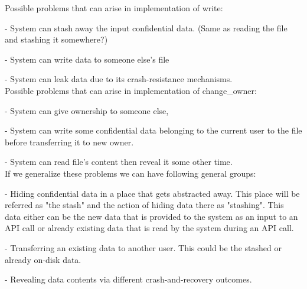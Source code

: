 \documentclass[onecolumn]{paper}
\begin{document}
Possible problems that can arise in implementation of write:

- System can stash away the input confidential data. 
(Same as reading the file and stashing it somewhere?)

- System can write data to someone else's file

- System can leak data due to its crash-resistance mechanisms.\\

Possible problems that can arise in implementation of change\_owner:

- System can give ownership to someone else,

- System can write some confidential data belonging to the current user 
to the file before transferring it to new owner.

- System can read file's content then reveal it some other time.\\

If we generalize these problems we can have following general groups:

- Hiding confidential data in a place that gets abstracted away.
This place will be referred as "the stash" and the action of hiding data there as "stashing". This data either can be the new data that is provided to the system as an input to an API call or already existing data that is read by the system during an API call.

- Transferring an existing data to another user. This could be the stashed or already on-disk data.

- Revealing data contents via different crash-and-recovery outcomes.






\end{document}
